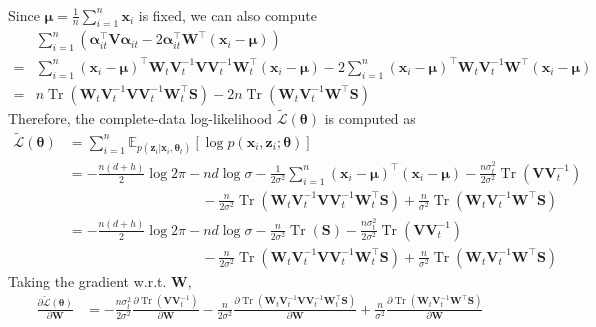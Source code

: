 \documentclass[11pt]{article}
\DeclareMathOperator{\tr}{Tr}
\begin{document}
\begin{enumerate}
\begin{enumerate}
\begin{align*}
    \end{align*}
    Since $\bm\mu=\frac{1}{n}\sum_{i=1}^{n}\bm x_i$ is fixed, we can also compute
    \begin{align*}
    & \sum_{i=1}^{n}\left(\bm\alpha_{it}^{\top}\bm V\bm\alpha_{it}-2\bm\alpha_{it}^{\top}\bm W^{\top}(\bm x_i-\bm\mu)\right) \\
    =& \sum_{i=1}^{n}(\bm x_i-\bm\mu)^{\top}\bm W_t\bm V_t^{-1}\bm V\bm V_t^{-1}\bm W_t^{\top}(\bm x_i-\bm\mu)-2\sum_{i=1}^{n}(\bm x_i-\bm\mu)^{\top}\bm W_t\bm V_t^{-1}\bm W^{\top}(\bm x_i-\bm\mu) \\
    =& n\tr\left(\bm W_t\bm V_t^{-1}\bm V\bm V_t^{-1}\bm W_t^{\top}\bm S\right)-2n\tr\left(\bm W_t\bm V_t^{-1}\bm W^{\top}\bm S\right)
    \end{align*}
    Therefore, the complete-data log-likelihood $\tilde{\mathcal{L}}(\bm\theta)$ is computed as
    \begin{align*}
    \tilde{\mathcal{L}}(\bm\theta) &=
    \sum_{i=1}^{n}\mathbb{E}_{p(\bm z_i|\bm x_i,\bm\theta_t)}[\log p(\bm x_i,\bm z_i;\bm\theta)] \\
    &= -\frac{n(d+h)}{2}\log 2\pi-nd\log\sigma-\frac{1}{2\sigma^2}\sum_{i=1}^{n}(\bm x_i-\bm\mu)^{\top}(\bm x_i-\bm\mu)-\frac{n\sigma_t^2}{2\sigma^2}\tr\left(\bm V\bm V_t^{-1}\right) \\
    &\hspace{4cm} -\frac{n}{2\sigma^2}\tr\left(\bm W_t\bm V_t^{-1}\bm V\bm V_t^{-1}\bm W_t^{\top}\bm S\right)+\frac{n}{\sigma^2}\tr\left(\bm W_t\bm V_t^{-1}\bm W^{\top}\bm S\right) \\
    &= -\frac{n(d+h)}{2}\log 2\pi-nd\log\sigma-\frac{n}{2\sigma^2}\tr(\bm S)-\frac{n\sigma_t^2}{2\sigma^2}\tr\left(\bm V\bm V_t^{-1}\right) \\
    &\hspace{4cm} -\frac{n}{2\sigma^2}\tr\left(\bm W_t\bm V_t^{-1}\bm V\bm V_t^{-1}\bm W_t^{\top}\bm S\right)+\frac{n}{\sigma^2}\tr\left(\bm W_t\bm V_t^{-1}\bm W^{\top}\bm S\right)
    \end{align*}
    Taking the gradient w.r.t. $\bm W$,
    \begin{align*}
    \frac{\partial\tilde{\mathcal{L}}(\bm\theta)}{\partial\bm W}
    &= -\frac{n\sigma_t^2}{2\sigma^2}\frac{\partial\tr\left(\bm V\bm V_t^{-1}\right)}{\partial\bm W}-\frac{n}{2\sigma^2}\frac{\partial\tr\left(\bm W_t\bm V_t^{-1}\bm V\bm V_t^{-1}\bm W_t^{\top}\bm S\right)}{\partial\bm W}+\frac{n}{\sigma^2}\frac{\partial\tr\left(\bm W_t\bm V_t^{-1}\bm W^{\top}\bm S\right)}{\partial\bm W}
    \end{align*}

\end{enumerate}
\end{enumerate}
\end{document}
